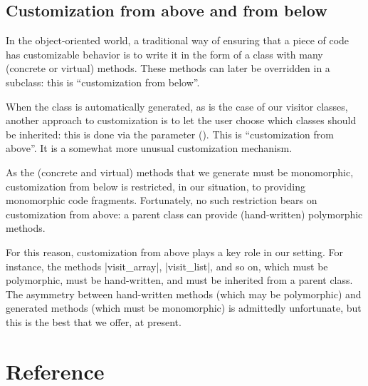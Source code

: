 \documentclass[11pt,a4paper,twoside]{article}
\begin{document}

\subsection{Customization from above and from below}

In the object-oriented world, a traditional way of ensuring that a piece of
code has customizable behavior is to write it in the form of a class with many
(concrete or virtual) methods. These methods can later be overridden in a
subclass: this is ``customization from below''.

When the class is automatically generated, as is the case of our visitor
classes, another approach to customization is to let the user choose which
classes should be inherited: this is done via the \ancestors parameter
(). This is ``customization from above''. It is a somewhat
more unusual customization mechanism.

As the (concrete and virtual) methods that we generate must be monomorphic,
customization from below is restricted, in our situation, to providing
monomorphic code fragments. Fortunately, no such restriction bears on
customization from above: a parent class can provide (hand-written)
polymorphic methods.

For this reason, customization from above plays a key role in our setting. For
instance, the methods \oc|visit_array|, \oc|visit_list|, and so on, which must
be polymorphic, must be hand-written, and must be inherited from a parent
class. The asymmetry between hand-written methods (which may be polymorphic)
and generated methods (which must be monomorphic) is admittedly unfortunate,
but this is the best that we offer, at present.



\section{Reference}

\end{document}
